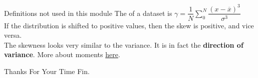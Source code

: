 \documentclass[10pt,sans,english,compress,xcolor=dvipsnames]{beamer}
\begin{document}
\begin{frame}[fragile]{Definitions not used in this module}
The   of a dataset  is $\gamma = \dfrac{1}{N} \sum\limits_0^N  \dfrac{ (x-\overline{x})^3 }{\sigma^3}$\\[2ex]

If the distribution is shifted to positive values, then the skew is positive, and vice versa.\\[1ex]

The skewness looks very similar to the variance. It is in fact the \textbf{direction of variance}. More about moments \href{https://docs.scipy.org/doc/scipy/reference/generated/scipy.stats.moment.html}{here}.\\[1ex]

\end{frame}

%
%
%


%
%
%
%
%


\begin{frame}{Thanks For Your Time}
\center
\Huge
Fin.
\end{frame}
\end{document}
